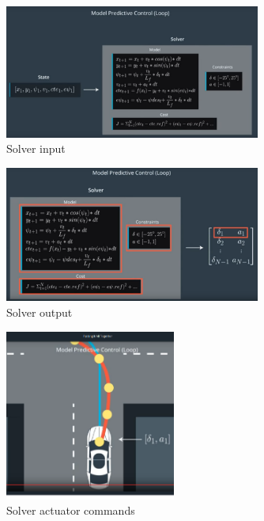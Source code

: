 \documentclass[11pt]{article}
\begin{document}
\begin{figure}[h]
    \centering
    \includegraphics[width=0.75\textwidth]{solver_in}
    \caption{Solver input}
    \label{fig:solver_in}
\end{figure}

\begin{figure}[h]
    \centering
    \includegraphics[width=0.75\textwidth]{solver_out}
    \caption{Solver output}
    \label{fig:solver_out}
\end{figure}

\begin{figure}[h]
    \centering
    \includegraphics[width=0.5\textwidth]{solver_actuate}
    \caption{Solver actuator commands}
    \label{fig:solver_actuate}
\end{figure}

\FloatBarrier
\end{document}
